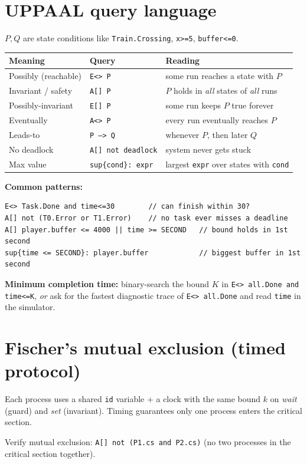 \section{UPPAAL query language}
$P,Q$ are state conditions like \texttt{Train.Crossing}, \texttt{x>=5}, \texttt{buffer<=0}.
\begin{center}\small
\begin{tabular}{@{}lll@{}}
\toprule
Meaning & Query & Reading\\
\midrule
Possibly (reachable) & \texttt{E<> P} & some run reaches a state with $P$\\
Invariant / safety & \texttt{A[] P} & $P$ holds in \emph{all} states of \emph{all} runs\\
Possibly-invariant & \texttt{E[] P} & some run keeps $P$ true forever\\
Eventually & \texttt{A<> P} & every run eventually reaches $P$\\
Leads-to & \texttt{P --> Q} & whenever $P$, then later $Q$\\
No deadlock & \texttt{A[] not deadlock} & system never gets stuck\\
Max value & \texttt{sup\{cond\}: expr} & largest \texttt{expr} over states with \texttt{cond}\\
\bottomrule
\end{tabular}
\end{center}
\textbf{Common patterns:}
\begin{lstlisting}
E<> Task.Done and time<=30        // can finish within 30?
A[] not (T0.Error or T1.Error)    // no task ever misses a deadline
A[] player.buffer <= 4000 || time >= SECOND   // bound holds in 1st second
sup{time <= SECOND}: player.buffer            // biggest buffer in 1st second
\end{lstlisting}
\textbf{Minimum completion time:} binary-search the bound $K$ in \texttt{E<> all.Done and time<=K}, \emph{or} ask for the fastest diagnostic trace of \texttt{E<> all.Done} and read \texttt{time} in the simulator.

\section{Fischer's mutual exclusion (timed protocol)}
Each process uses a shared \texttt{id} variable + a clock with the same bound $k$ on \emph{wait} (guard) and \emph{set} (invariant). Timing guarantees only one process enters the critical section.
\begin{keybox}
\centering Verify mutual exclusion: \texttt{A[] not (P1.cs and P2.cs)} \quad(no two processes in the critical section together).
\end{keybox}


